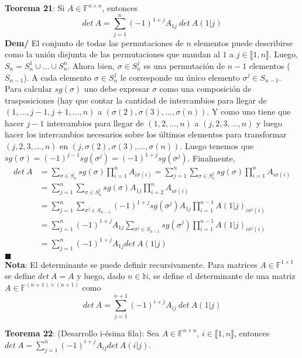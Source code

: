 \documentclass[11pt,a4paper]{article}
\newcommand*{\QEDA}{\null\nobreak\hfill\ensuremath{\blacksquare}}
\begin{document}
\textbf{Teorema 21}: Si $A \in \mathbb{F}^{n \times n}$, entonces 
$$det\ A = \sum_{j=1}^n (-1)^{1+j} A_{1j}\ det\ A(1|j)$$
\textbf{Dem/} El conjunto de todas las permutaciones de $n$ elementos puede describirse como la uni\'on disjunta de las permutaciones que mandan al $1$ a $j \in \llbracket 1,n \rrbracket$. Luego, $S_n = S^1_n \cup \hdots \cup S_n^n$. Ahora bien, $\sigma \in S_n^j$ es una permutaci\'on de $n-1$ elementos ($S_{n-1}$). A cada elemento $\sigma \in S_n^j$ le corresponde un \'unico elemento $\sigma^j \in S_{n-1}$. Para calcular $sg(\sigma)$ uno debe expresar $\sigma$ como una composici\'on de trasposiciones (hay que contar la cantidad de intercambios para llegar de $(1,...,j-1,j+1,...,n)$ a $(\sigma(2), \sigma(3),...,\sigma(n))$. Y como uno tiene que hacer $j-1$ intercambios para llegar de $(1,2,...,n)$ a $(j,2,3,...,n)$ y luego hacer los intercambios necesarios sobre los \'ultimos elementos para transformar $(j,2,3,...,n)$ en $(j,\sigma(2),\sigma(3),...,\sigma(n))$. Luego tenemos que $sg(\sigma) = (-1)^{j-1} sg(\sigma^j) = (-1)^{1+j} sg(\sigma^j)$. Finalmente,
\begin{align*}
det\ A
&= \sum_{\sigma \in S_n} sg(\sigma) \prod_{i=1}^n A_{i\sigma(i)}
= \sum_{j=1}^n \sum_{\sigma \in S_n^j} sg(\sigma) \prod_{i=1}^n A_{i\sigma(i)}\\
&= \sum_{j=1}^n \sum_{\sigma \in S_n^j} sg(\sigma) A_{1j} \prod_{i=2}^n A_{i\sigma(i)}\\
&= \sum_{j=1}^n \sum_{\sigma^j \in S_{n-1}}  (-1)^{1+j} sg(\sigma^j) A_{1j} \prod_{i=1}^{n-1} A(1|j)_{i\sigma^j(i)}\\
&= \sum_{j=1}^n (-1)^{1+j} A_{1j} \sum_{\sigma^j \in S_{n-1}} sg(\sigma^j) \prod_{i=1}^{n-1} A(1|j)_{i\sigma^j(i)}\\
&= \sum_{j=1}^n (-1)^{1+j} A_{1j} det\ A(1|j)
\end{align*}
\QEDA\\

\textbf{Nota}: El determinante se puede definir recursivamente. Para matrices $A \in \mathbb{F}^{1 \times 1}$ se define $det\ A = A$ y luego, dado $n \in \mathbb{N}$, se define el determinante de una matriz $A \in \mathbb{F}^{(n+1) \times (n+1)}$ como $$det\ A = \sum_{j=1}^{n+1} (-1)^{i+j} A_{ij}\ det\ A(1|j)$$

\newpage

\textbf{Teorema 22}: (Desarrollo i-\'esima fila): Sea $A \in \mathbb{F}^{n \times n}$, $i \in \llbracket 1,n \rrbracket$, entonces 
$\displaystyle{det\ A = \sum_{j=1}^n (-1)^{i+j} A_{ij} det\ A(i|j)}$. \\
\end{document}
